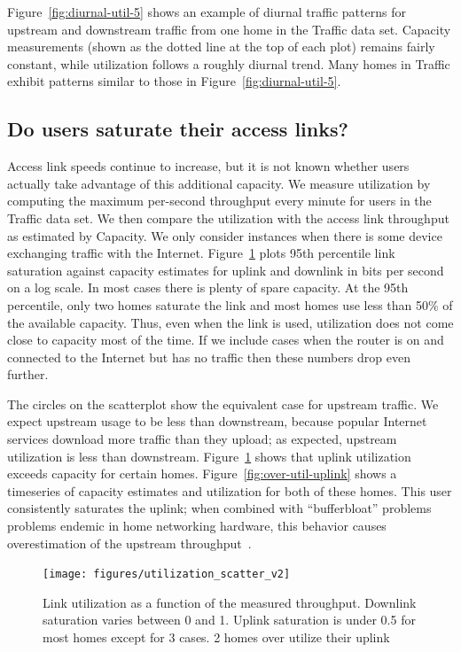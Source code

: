 Figure~\ref{fig:diurnal-util-5} shows an example of diurnal traffic
patterns for upstream and downstream traffic from one home in the 
Traffic data set.  Capacity measurements (shown as the dotted line at the top
of each plot) remains fairly constant, while utilization follows a
roughly diurnal trend.  Many homes in Traffic exhibit patterns
similar to those in Figure~\ref{fig:diurnal-util-5}.

\subsection{Do users saturate their access links?}\label{sec:saturate}
Access link speeds
continue to increase, but it is not known whether users actually take
advantage of this additional capacity.  We measure utilization by computing
the maximum per-second throughput every minute for users in the Traffic
data set. We then compare the 
utilization with the access link throughput as estimated by
Capacity. We only consider instances when there is
some device exchanging traffic with the Internet.
Figure~\ref{fig:util-scatter-logx} plots 95th percentile link
saturation against capacity estimates for uplink and downlink in bits
per second on a log scale.
In most cases there is plenty of spare capacity.
At the 95th percentile, only two homes saturate the link and most homes
use less than 50\% of the available capacity.
Thus, even when the link is used, utilization does not come close
to capacity most of the time. If we include cases when the router is on
and connected to the Internet but has no traffic then these numbers drop
even further.

The circles on the scatterplot show the equivalent case for upstream
traffic. We expect upstream usage to be less than downstream, because
popular Internet services download more traffic than they upload; as
expected, upstream utilization is less than downstream.
Figure~\ref{fig:util-scatter-logx} shows that uplink utilization exceeds
capacity for certain homes.  Figure~\ref{fig:over-util-uplink} shows a
timeseries of capacity estimates and utilization for both of these
homes.  This user consistently saturates the uplink; when combined with
``bufferbloat'' problems problems endemic in home networking hardware,
this behavior causes overestimation of the upstream
throughput~\cite{www-bufferbloat}.

\begin{figure}[t]
  \texttt{[image: figures/utilization\_scatter\_v2]}
  \caption{Link utilization as a function of the measured throughput.
    Downlink saturation varies between 0 and 1. Uplink saturation is
    under 0.5 for most homes except for 3 cases. 2 homes over utilize
    their uplink} \label{fig:util-scatter-logx}
\end{figure}



